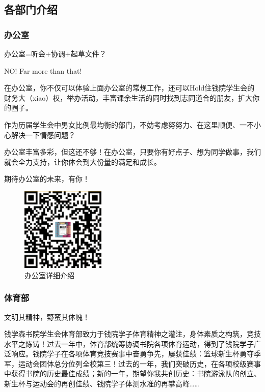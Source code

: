\documentclass[
decoration,  %
]{qyxf-book}
\begin{document}
	\subsection{各部门介绍}
	
	\subsubsection{办公室}
	办公室=听会+协调+起草文件？
	
    NO! Far more than that!
    
    在办公室，你不仅可以体验上面办公室的常规工作，还可以Hold住钱院学生会的财务大（xiao）权，举办活动，丰富课余生活的同时找到志同道合的朋友，扩大你的圈子。
    
    作为历届学生会中男女比例最均衡的部门，不妨考虑努努力、在这里顺便、一不小心解决一下情感问题？
    
    办公室丰富多彩，但这还不够！在办公室，只要你有好点子、想为同学做事，我们就会全力支持，让你体会到大份量的满足和成长。
    
    期待办公室的未来，有你！

	\begin{figure}[htbp]
	\centering
	\includegraphics[width=4cm]{pics/officeqrcode.png}
	\setlength{\abovecaptionskip}{0.0cm}
	\setlength{\belowcaptionskip}{0.2cm}
	\caption*{办公室详细介绍}
	\end{figure}
	
	\subsubsection{体育部}
	文明其精神，野蛮其体魄！
	
    钱学森书院学生会体育部致力于钱院学子体育精神之灌注，身体素质之构筑，竞技水平之炼铸！过去一年中，体育部统筹协调书院各项体育运动，得到了钱院学子广泛响应。钱院学子在各项体育竞技赛事中奋勇争先，屡获佳绩：篮球新生杯勇夺季军，运动会团体总分位列全校第三！过去的一年，我们突破历史，在各项校级赛事中获得书院的历史最佳成绩；新的一年，期望你我共创历史：书院游泳队的创立、新生杯与运动会的再创佳绩、钱院学子体测水准的再攀高峰……
    
\end{document}
